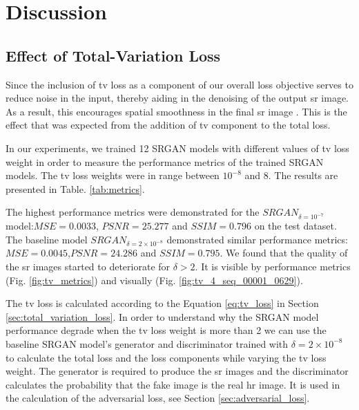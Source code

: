 \documentclass[conference]{IEEEtran}
\begin{document}
\section{Discussion}

\subsection{Effect of Total-Variation Loss}

Since the inclusion of \acrshort{tv} loss as a component of our overall loss objective serves to reduce noise in the input, thereby aiding in the denoising of the output \acrshort{sr} image. As a result, this encourages spatial smoothness in the final \acrshort{sr} image \cite{iSeeBetter_2020}. This is the effect that was expected from the addition of \acrshort{tv} component to the total loss.

In our experiments, we trained 12 SRGAN models with different values of \acrshort{tv} loss weight in order to measure the performance metrics of the trained SRGAN models. The \acrshort{tv} loss weights were in range between $10^{-8}$ and $8$. The results are presented in Table. \ref{tab:metrics}.

The highest performance metrics were demonstrated for the $SRGAN_{\delta=10^{-7}}$ model:\newline $MSE=0.0033$, $PSNR=25.277$ and $SSIM=0.796$ on the test dataset. The baseline model $SRGAN_{\delta={2 \times 10^{-8}}}$ demonstrated similar performance metrics: $MSE=0.0045$,\newline $PSNR=24.286$ and $SSIM=0.795$. We found that the quality of the \acrshort{sr} images started to deteriorate for $\delta > 2$. It is visible by performance metrics (Fig. \ref{fig:tv_metrics}) and visually (Fig. \ref{fig:tv_4_seq_00001_0629}).

The \acrshort{tv} loss is calculated according to the Equation \ref{eq:tv_loss} in Section \ref{sec:total_variation_loss}. In order to understand why the SRGAN model performance degrade when the \acrshort{tv} loss weight is more than 2 we can use the baseline SRGAN model's generator and discriminator trained with $\delta = 2 \times 10^{-8}$ to calculate the total loss and the loss components while varying the \acrshort{tv} loss weight. The generator is required to produce the \acrshort{sr} images and the discriminator calculates the probability that the fake image is the real \acrlong{hr} image. It is used in the calculation of the adversarial loss, see Section \ref{sec:adversarial_loss}.
\end{document}
